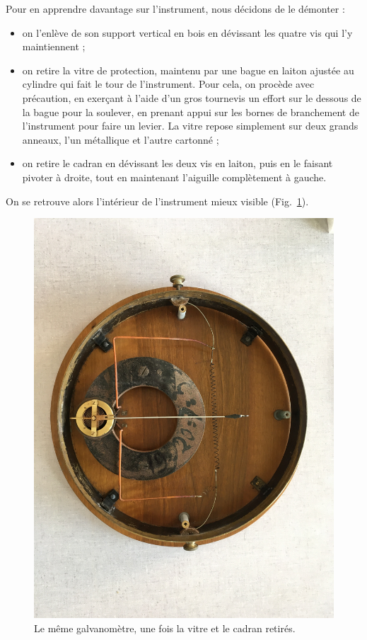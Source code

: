 \documentclass[12pt,a4paper,fleqn]{article}
\begin{document}
Pour en apprendre davantage sur l'instrument, nous décidons de le démonter :
\begin{itemize}
    \item on l'enlève de son support vertical en bois en dévissant les quatre vis qui l'y maintiennent ;
    \item on retire la vitre de protection, maintenu par une bague en laiton ajustée au cylindre qui fait le tour de l'instrument.
    Pour cela, on procède avec précaution, en exerçant à l'aide d'un gros tournevis un effort sur le dessous de la bague pour la soulever, en prenant appui sur les bornes de branchement de l'instrument pour faire un levier.
    La vitre repose simplement sur deux grands anneaux, l'un métallique et l'autre cartonné ;
    \item on retire le cadran en dévissant les deux vis en laiton, puis en le faisant pivoter à droite, tout en maintenant l'aiguille complètement à gauche.
\end{itemize}
On se retrouve alors l'intérieur de l'instrument mieux visible (Fig.~\ref{fig:galva_amp_int}).

\begin{figure}[htbp]
    \center
    \includegraphics[height=300 pt, trim=500 100 600 200, clip]{images/IMG_4037.JPG}
    \caption{Le même galvanomètre, une fois la vitre et le cadran retirés.}
    \label{fig:galva_amp_int}
\end{figure}
\end{document}
